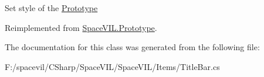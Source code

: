 Set style of the \mbox{\hyperlink{class_space_v_i_l_1_1_prototype}{Prototype}} 



Reimplemented from \mbox{\hyperlink{class_space_v_i_l_1_1_prototype_ae96644a6ace490afb376fb542161e541}{Space\+V\+I\+L.\+Prototype}}.



The documentation for this class was generated from the following file\+:\begin{DoxyCompactItemize}
\item 
F\+:/spacevil/\+C\+Sharp/\+Space\+V\+I\+L/\+Space\+V\+I\+L/\+Items/Title\+Bar.\+cs\end{DoxyCompactItemize}
